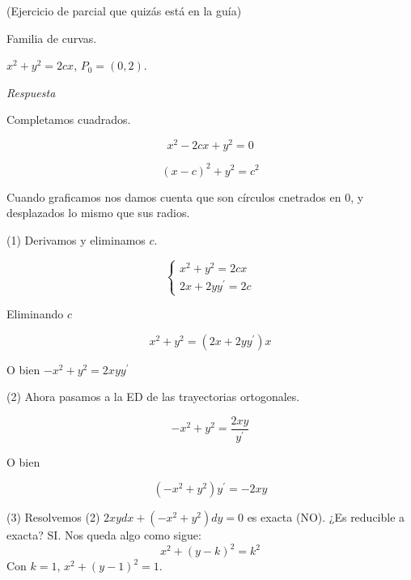 \begin{exercise}

(Ejercicio de parcial que quiz\'as est\'a en la gu\'ia)

Familia de curvas.

$x^2 + y^2 = 2cx$, $P_0 = (0,2)$.

\emph{Respuesta}

Completamos cuadrados.

$$
x^2 -2cx + y^2 = 0
$$

$$
(x-c)^2 + y^2 = c^2
$$

Cuando graficamos nos damos cuenta que son c\'irculos cnetrados en 0, y desplazados lo mismo que sus radios. %

(1) Derivamos y eliminamos $c$.

\begin{equation}
\begin{cases}
	x^2 + y^2 = 2cx \\
	2x + 2yy^{\prime} = 2c
\end{cases}
\end{equation}

Eliminando $c$

$$
x^2 + y^2 = (2x + 2yy^{\prime})x
$$

O bien $-x^2 + y^2 = 2xyy^{\prime}$

(2) Ahora pasamos a la ED de las trayectorias ortogonales.

$$
-x^2 + y^2 = \frac{2xy}{y^{\prime}}
$$

O bien 

$$
(-x^2 + y^2)y^{\prime} = -2xy
$$

(3) Resolvemos (2) $2xydx + (-x^2 + y^2)dy = 0$ es exacta (NO). ¿Es reducible a exacta? SI.
Nos queda algo como sigue:
$$
x^2 + (y - k)^2 = k^2
$$
Con $k = 1$, $x^2 + (y - 1)^2 = 1$.

\end{exercise}